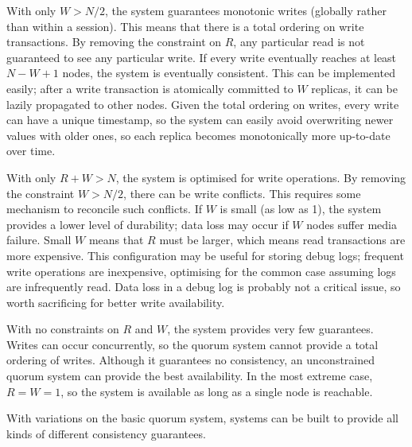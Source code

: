 \documentclass[12pt,a4paper,twoside,openany]{report}
\begin{document}
With only $W > N/2$, the system guarantees monotonic writes (globally rather than within a session). This means that there is a total ordering on write transactions. By removing the constraint on $R$, any particular read is not guaranteed to see any particular write. If every write eventually reaches at least $N - W + 1$ nodes, the system is eventually consistent. This can be implemented easily; after a write transaction is atomically committed to $W$ replicas, it can be lazily propagated to other nodes. Given the total ordering on writes, every write can have a unique timestamp, so the system can easily avoid overwriting newer values with older ones, so each replica becomes monotonically more up-to-date over time.

With only $R + W > N$, the system is optimised for write operations. By removing the constraint $W > N/2$, there can be write conflicts. This requires some mechanism to reconcile such conflicts. If $W$ is small (as low as 1), the system provides a lower level of durability; data loss may occur if $W$ nodes suffer media failure. Small $W$ means that $R$ must be larger, which means read transactions are more expensive. This configuration may be useful for storing debug logs; frequent write operations are inexpensive, optimising for the common case assuming logs are infrequently read. Data loss in a debug log is probably not a critical issue, so worth sacrificing for better write availability.

With no constraints on $R$ and $W$, the system provides very few guarantees. Writes can occur concurrently, so the quorum system cannot provide a total ordering of writes. Although it guarantees no consistency, an unconstrained quorum system can provide the best availability. In the most extreme case, $R = W = 1$, so the system is available as long as a single node is reachable.

With variations on the basic quorum system, systems can be built to provide all kinds of different consistency guarantees.
\end{document}

